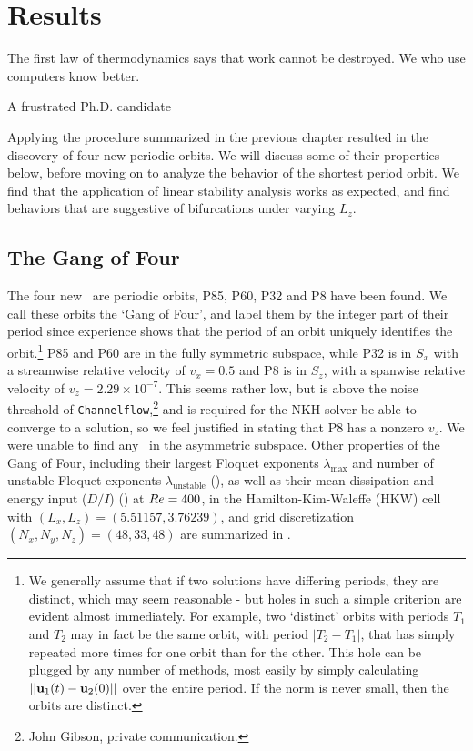 \chapter{Results}
\epigraph{The first law of thermodynamics says that work cannot be destroyed. We who use computers know better.}{A frustrated Ph.D. candidate}

Applying the procedure summarized in the previous chapter resulted in the discovery of four new periodic orbits. We will discuss some of their properties below, before moving on to analyze the behavior of the shortest period orbit. We find that the application of linear stability analysis works as expected, and find behaviors that are suggestive of bifurcations under varying $L_z$.   
\section{The Gang of Four}

The four new \ecs\ are periodic orbits, P85, P60, P32 and P8 have been found. We call these orbits the `Gang of Four', and label them by the integer part of their period since experience shows that the period of an orbit uniquely identifies the orbit.\footnote{We generally assume that if two solutions have differing periods, they are distinct, which may seem reasonable - but holes in such a simple criterion are evident almost immediately. For example, two `distinct' orbits with periods $T_1$ and $T_2$ may in fact be the same orbit, with period $|T_2-T_1|$, that has simply repeated more times for one orbit than for the other. This hole can be plugged by any number of methods, most easily by simply calculating $||\mathbf{u}_1(t) - \mathbf{u}_2(0)||$ over the entire period. If the norm is never small, then the orbits are distinct. }  P85 and P60 are in the fully symmetric subspace, while P32 is in $S_x$ with a streamwise relative velocity of $v_x = 0.5$ and P8 is in $S_z$, with a spanwise relative velocity of $v_z = 2.29\times 10^{-7}$. This seems rather low, but is above the noise threshold of {\tt Channelflow},\footnote{John Gibson, private communication.} and is required for the NKH solver be able to converge to a solution, so we feel justified in stating that P8 has a nonzero $v_z$. We were unable to find any \ecs\ in the asymmetric subspace. Other properties of the Gang of Four, including their largest Floquet exponents $\lambda_{\textrm{max}}$ and number of unstable Floquet exponents $\lambda_{\textrm{unstable}}$ (), as well as their mean dissipation and energy input ($\bar{D}/\bar{I}$) () at  $Re = 400$, in the Hamilton-Kim-Waleffe (HKW) cell with $(L_x,L_z) = (5.51157, 3.76239)$, and grid discretization $(N_x,N_y,N_z)= (48,33,48)$  are summarized in . 

